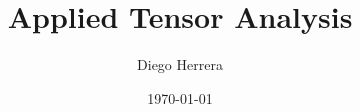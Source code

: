 %
\author[D. Herrera]{Diego Herrera}
\title[Applied TA]{Applied Tensor Analysis}
\date{\today}
%
%
\makeatletter
{}
\makeatother
%
\renewcommand{\PrelimWords}
    {Applied TA -- D. Herrera -- Version 1.0.0}
%
